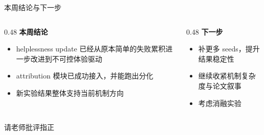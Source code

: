 \documentclass[aspectratio=169]{beamer}
\begin{document}
\begin{frame}{本周结论与下一步}
\begin{columns}[T]
\begin{column}{0.48\textwidth}
\textbf{本周结论}
\begin{itemize}
    \item helplessness update 已经从原本简单的失败累积进一步改进到不可控体验驱动
    \item attribution 模块已成功接入，并能跑出分化
    \item 新实验结果整体支持当前机制方向
\end{itemize}
\end{column}

\begin{column}{0.48\textwidth}
\textbf{下一步}
\begin{itemize}
    \item 补更多 seeds，提升结果稳定性
    \item 继续收紧机制复杂度与论文叙事
    \item 考虑消融实验
\end{itemize}
\end{column}
\end{columns}

\end{frame}

\begin{frame}
    \centering
    \Huge{请老师批评指正}
\end{frame}
\end{document}
